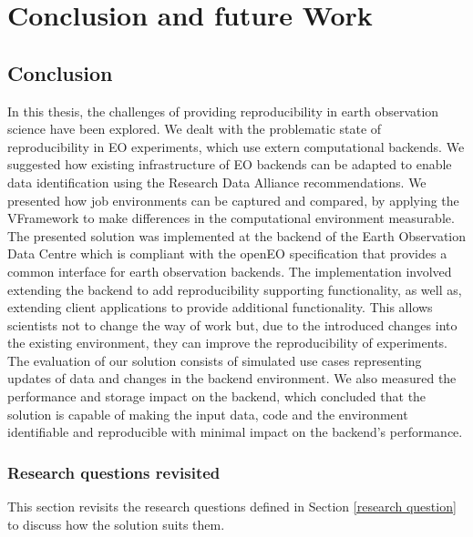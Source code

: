 \documentclass[draft,final]{vutinfth} %
\begin{document}
\chapter{Conclusion and future Work}\label{Conclusion}

\section{Conclusion}

In this thesis, the challenges of providing reproducibility in earth observation science have been explored. We dealt with the problematic state of reproducibility in EO experiments, which use extern computational backends. We suggested how existing infrastructure of EO backends can be adapted to enable data identification using the Research Data Alliance recommendations. We presented how job environments can be captured and compared, by applying the VFramework to make differences in the computational environment measurable. The presented solution was implemented at the backend of the Earth Observation Data Centre which is compliant with the openEO specification that provides a common interface for earth observation backends. The implementation involved extending the backend to add reproducibility supporting functionality, as well as, extending client applications to provide additional functionality. This allows scientists not to change the way of work but, due to the introduced changes into the existing environment, they can improve the reproducibility of experiments. The evaluation of our solution consists of simulated use cases representing updates of data and changes in the backend environment. We also measured the performance and storage impact on the backend, which concluded that the solution is capable of making the input data, code and the environment identifiable and reproducible with minimal impact on the backend's performance.       
\newpage
\subsection{Research questions revisited}\label{research question revisited}
This section revisits the research questions defined in Section \ref{research question} to discuss how the solution suits them.
\end{document}
